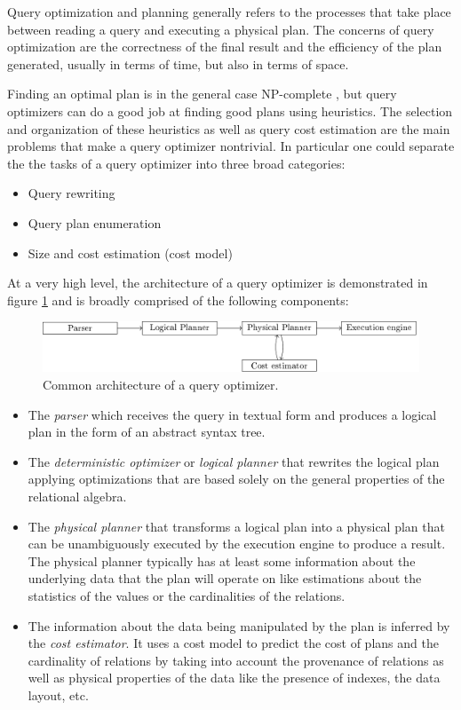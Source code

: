 Query optimization and planning generally refers to the processes that
take place between reading a query and executing a physical plan. The
concerns of query optimization are the correctness of the final result and
the efficiency of the plan generated, usually in terms of time, but
also in terms of space.

Finding an optimal plan is in the general case NP-complete
\cite{ullmanInformationIntegrationUsing1997}, but query optimizers can
do a good job at finding good plans using heuristics. The selection
and organization of these heuristics as well as query cost estimation
are the main problems that make a query optimizer nontrivial. In
particular one could separate the the tasks of a query optimizer
into three broad categories:

\begin{itemize}
\item Query rewriting
\item Query plan enumeration
\item Size and cost estimation (cost model)
\end{itemize}


At a very high level, the architecture of a query optimizer is
demonstrated in figure \ref{fig:optimizer_arch} and is broadly
comprised of the following components:

\begin{figure}[p]
\centering
\includegraphics[width=\textwidth]{./imgs/optimizer_architecture.pdf}
\caption{\label{fig:optimizer_arch}Common architecture of a query
  optimizer.}
\end{figure}

\begin{itemize}

\item The \emph{parser} which receives the query in textual form and
  produces a logical plan in the form of an abstract syntax tree.
\item The \emph{deterministic optimizer} or \emph{logical planner}
  that rewrites the logical plan applying optimizations that are based
  solely on the general properties of the relational algebra.
\item The \emph{physical planner} that transforms a logical plan into
  a physical plan that can be unambiguously executed by the execution
  engine to produce a result. The physical planner typically has at
  least some information about the underlying data that the plan will
  operate on like estimations about the statistics of the values or
  the cardinalities of the relations.
\item The information about the data being manipulated by the plan is
  inferred by the \emph{cost estimator}. It uses a cost model to
  predict the cost of plans and the cardinality of relations by taking
  into account the provenance of relations as well as physical
  properties of the data like the presence of indexes, the data layout,
  etc.
\end{itemize}


